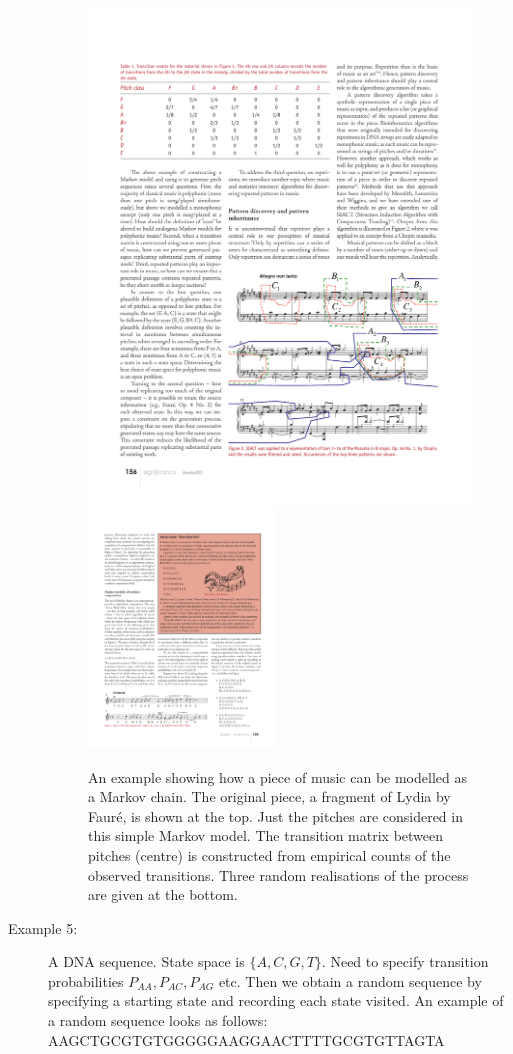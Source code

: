 \documentclass[11pt]{article}
\begin{document}
\begin{description}
\begin{figure}[hbtp]
\includegraphics[width=14cm]{figures/matrixlydia}
\includegraphics[width=5cm]{figures/randomlydia}
\caption{An example showing how a piece of music can be modelled as  a Markov chain.  The original piece, a fragment of  Lydia by Faur\'e, is shown at the top.  Just the pitches are considered in this simple Markov model.  The transition matrix between pitches (centre) is constructed from empirical counts of the observed transitions.  Three random realisations of the process are given at the bottom.  }
\label{fig:lydia}
\end{figure}

\item[Example 5:]  A DNA sequence.  State space is $\{A,C,G,T \}$.  Need to specify transition probabilities $P_{AA}, P_{AC}, P_{AG}$ etc.  Then we obtain a random sequence by specifying a starting state and recording each state visited.    An example of a random sequence looks as follows: AAGCTGCGTGTGGGGGAAGGAACTTTTGCGTGTTAGTA
\end{description}
\end{document}
